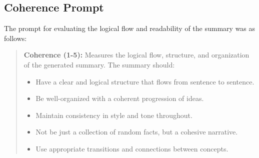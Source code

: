 \documentclass[11pt]{article}
\begin{document}
\subsection{Coherence Prompt}
The prompt for evaluating the logical flow and readability of the summary was as follows:

\begin{quote}
\textbf{Coherence (1-5):} Measures the logical flow, structure, and organization of the generated summary. The summary should:
\begin{itemize}
    \item Have a clear and logical structure that flows from sentence to sentence.
    \item Be well-organized with a coherent progression of ideas.
    \item Maintain consistency in style and tone throughout.
    \item Not be just a collection of random facts, but a cohesive narrative.
    \item Use appropriate transitions and connections between concepts.
\end{itemize}
\end{quote}
\end{document}
